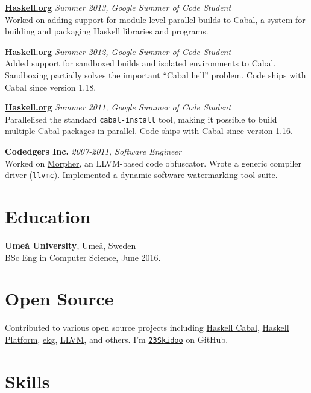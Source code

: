 \documentclass[margin,line]{res}
\begin{document}
\begin{resume}
        {\bf \href{https://haskell.org}{Haskell.org}} \hfill {\it Summer 2013, Google Summer of Code Student}\\
    Worked on adding support for module-level parallel builds to
    \href{https://haskell.org/cabal}{Cabal}, a system for building and
    packaging Haskell libraries and programs.

        {\bf \href{https://haskell.org}{Haskell.org}} \hfill {\it Summer 2012, Google Summer of Code Student}\\
    Added support for sandboxed builds and isolated environments to
    Cabal. Sandboxing partially solves the important ``Cabal hell'' problem. Code
    ships with Cabal since version 1.18.

        {\bf \href{https://haskell.org}{Haskell.org}} \hfill {\it Summer 2011, Google Summer of Code Student}\\
    Parallelised the standard \texttt{cabal-install} tool, making it possible to
    build multiple Cabal packages in parallel. Code ships with Cabal since version
    1.16.

        {\bf Codedgers Inc.} \hfill {\it 2007-2011, Software Engineer}\\
    Worked on \href{https://archive.is/ZAI8z}{Morpher}, an LLVM-based code
    obfuscator. Wrote a generic compiler driver
    (\href{https://llvm.org/releases/2.9/docs/CompilerDriver.html}{\texttt{llvmc}}). Implemented
    a dynamic software watermarking tool suite.

    \section{\sc Education}
     {\bf Umeå University}, Umeå, Sweden\\
    BSc Eng in Computer Science, June 2016.

    \section{\sc Open Source}

    Contributed to various open source projects including
    \href{https://github.com/haskell/cabal/}{Haskell Cabal}, \href{https://www.haskell.org/platform/}{Haskell Platform},
    \href{https://hackage.haskell.org/package/ekg}{ekg}, \href{https://llvm.org/}{LLVM}, and others.
    I'm \href{https://github.com/23Skidoo/}{\tt 23Skidoo} on GitHub.

    \section{\sc Skills}


\end{resume}
\end{document}
